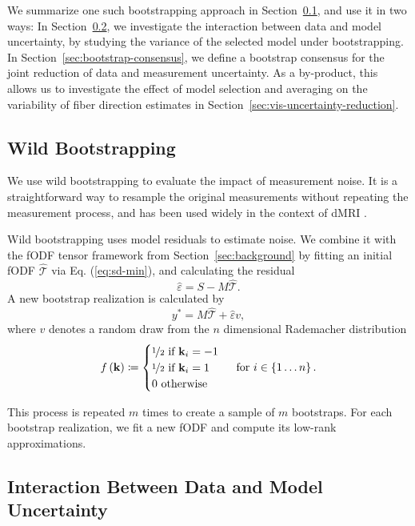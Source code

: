 We summarize one such bootstrapping approach in Section~\ref{sec:wild-bootstrap}, and use it in two ways: In Section~\ref{sec:data-vs-model-uncertainty}, we investigate the interaction between data and model uncertainty, by studying the variance of the selected model under bootstrapping. In Section~\ref{sec:bootstrap-consensus}, we define a bootstrap consensus for the joint reduction of data and measurement uncertainty. As a by-product, this allows us to investigate the effect of model selection and averaging on the variability of fiber direction estimates in Section~\ref{sec:vis-uncertainty-reduction}.

\subsection{Wild Bootstrapping}
\label{sec:wild-bootstrap}
We use wild bootstrapping to evaluate the impact of measurement noise. It is a straightforward way to
resample the original measurements without repeating the measurement process, and has been used widely in the context of dMRI
\cite{Jones:2008,Schultz:EuroVis2013,Siddiqui:2021}.

Wild bootstrapping uses model residuals to estimate noise. We combine it with the fODF tensor framework from Section~\ref{sec:background} by fitting an initial fODF
$\hat{\mathcal{T}}$ via Eq. (\ref{eq:sd-min}), and calculating the residual 
\[ \hat{\varepsilon} = S - M\hat{\mathcal{T}} .\] 
A new bootstrap realization is calculated by 
\[ y^{*} = M\hat{\mathcal{T}}  + \hat{\varepsilon} v , \]
where $v$ denotes a random draw from the $n$ dimensional Rademacher distribution
\[ f \left( \mathbf{k} \right) \coloneqq  \begin{cases} \nicefrac{1}{2} \text{ if }
		\mathbf{k}_i=-1 \\
		\nicefrac{1}{2} \text{ if } \mathbf{k}_i=1 \\
		0 \text { otherwise } 
\end{cases} \text{ for } i \in \left\{ 1\dots n \right\} . \]

This process is repeated $m$ times to create a sample of $m$ bootstraps. For each bootstrap realization, we fit a new fODF and compute its low-rank approximations.


\subsection{Interaction Between Data and Model Uncertainty}
\label{sec:data-vs-model-uncertainty}

